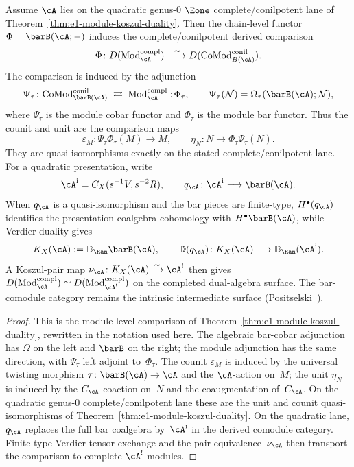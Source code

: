 \begin{proposition}
\label{prop:module-koszul-equivalence}
Assume $\cA$ lies on the quadratic genus-$0$ $\Eone$
complete/conilpotent lane of
Theorem~\ref{thm:e1-module-koszul-duality}. Then the chain-level
functor $\Phi=\barB(\cA;-)$ induces the complete/conilpotent derived
comparison
\[
\Phi\colon
D(\mathrm{Mod}^{\mathrm{compl}}_{\cA})
\;\xrightarrow{\;\sim\;}
D(\mathrm{CoMod}^{\mathrm{conil}}_{\bar{B}(\cA)}).
\]
The comparison is induced by the adjunction
\[
\Psi_\tau\colon
\mathrm{CoMod}^{\mathrm{conil}}_{\barB(\cA)}
\;\rightleftarrows\;
\mathrm{Mod}^{\mathrm{compl}}_{\cA}
:\!\Phi_\tau,
\qquad
\Psi_\tau(\mathcal N)=
\Omega_\tau(\barB(\cA);\mathcal N),
\]
where $\Psi_\tau$ is the module cobar functor and $\Phi_\tau$ is the
module bar functor. Thus the counit and unit are the comparison maps
\[
\varepsilon_M\colon \Psi_\tau\Phi_\tau(M)\longrightarrow M,\qquad
\eta_N\colon N\longrightarrow \Phi_\tau\Psi_\tau(N).
\]
They are quasi-isomorphisms exactly on the stated
complete/conilpotent lane.
For a quadratic presentation, write
\[
 \cA^{\mathrm i}=C_X(s^{-1}V,s^{-2}R),
 \qquad
 q_\cA\colon\cA^{\mathrm i}\longrightarrow\barB(\cA).
\]
When $q_\cA$ is a quasi-isomorphism and the bar pieces are finite-type,
$H^\bullet(q_\cA)$ identifies the presentation-coalgebra cohomology
with $H^\bullet\barB(\cA)$, while Verdier duality gives
\[
 K_X(\cA):=\mathbb D_{\Ran}\barB(\cA),\qquad
 \mathbb D(q_\cA)\colon K_X(\cA)\longrightarrow
 \mathbb D_{\Ran}(\cA^{\mathrm i}).
\]
A Koszul-pair map $\nu_\cA\colon K_X(\cA)\xrightarrow{\sim}\cA^!$
then gives
$D(\mathrm{Mod}^{\mathrm{compl}}_{\cA})
\simeq D(\mathrm{Mod}^{\mathrm{compl}}_{\cA^!})$ on the completed
dual-algebra surface.  The bar-comodule category remains the intrinsic
intermediate surface (Positselski~\cite[\S4]{Positselski11}).
\end{proposition}

\begin{proof}
This is the module-level comparison of
Theorem~\ref{thm:e1-module-koszul-duality}, rewritten in the notation
used here. The algebraic bar-cobar adjunction has
$\Omega$ on the left and $\barB$ on the right; the module adjunction
has the same direction, with $\Psi_\tau$ left adjoint to~$\Phi_\tau$.
The counit $\varepsilon_M$ is induced by the universal twisting
morphism $\tau\colon\barB(\cA)\to\cA$ and the $\cA$-action on~$M$;
the unit $\eta_N$ is induced by the $C_\cA$-coaction on~$N$ and the
coaugmentation of~$C_\cA$. On the quadratic genus-$0$
complete/conilpotent lane these are the unit and counit
quasi-isomorphisms of
Theorem~\ref{thm:e1-module-koszul-duality}.  On the quadratic lane,
$q_\cA$ replaces the full bar coalgebra by~$\cA^{\mathrm i}$ in the
derived comodule category.  Finite-type Verdier tensor exchange and
the pair equivalence~$\nu_\cA$ then transport the comparison to
complete $\cA^!$-modules.
\end{proof}

